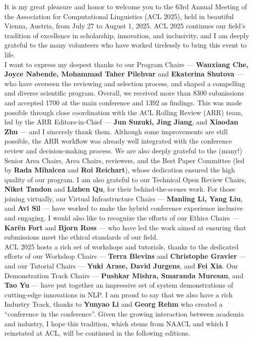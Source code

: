 It is my great pleasure and honor to welcome you to the 63rd Annual Meeting of the Association for Computational Linguistics (ACL 2025), held in beautiful Vienna, Austria, from July 27 to August 1, 2025. ACL 2025 continues our field’s tradition of excellence in scholarship, innovation, and inclusivity, and I am deeply grateful to the many volunteers who have worked tirelessly to bring this event to life.\\


I want to express my deepest thanks to our Program Chairs	--- \textbf{Wanxiang Che, Joyce Nabende, Mohammad Taher Pilehvar} and \textbf{Ekaterina Shutova} --- who have overseen the reviewing and selection process, and shaped a compelling and diverse scientific program. Overall, we received more than 8300 submissions and accepted 1700 at the main conference and 1392 as findings. This was made possible through close coordination with the ACL Rolling Review (ARR) team, led by the ARR Editors-in-Chief --- \textbf{Jun Suzuki, Jing Jiang}, and \textbf{Xiaodan Zhu} --- and I sincerely thank them. Although some improvements are still possible, the ARR workflow was already well integrated with the conference review and decision-making process. We are also deeply grateful to the (many!) Senior Area Chairs, Area Chairs, reviewers, and the Best Paper Committee (led by \textbf{Rada Mihalcea} and \textbf{Roi Reichart}), whose dedication ensured the high quality of our program. I am also grateful to our Technical Open Review Chairs, \textbf{Niket Tandon} and \textbf{Lizhen Qu}, for their behind-the-scenes work. For those joining virtually, our Virtual Infrastructure Chairs --- \textbf{Manling Li, Yang Liu}, and \textbf{Avi Sil} --- have worked to make the hybrid conference experience inclusive and engaging. I would also like to recognize the efforts of our Ethics Chairs --- \textbf{Karën Fort} and \textbf{Bjorn Ross} --- who have led the work aimed at ensuring that submissions meet the ethical standards of our field. \\


ACL 2025 hosts a rich set of workshops and tutorials, thanks to the dedicated efforts of our Workshop Chairs 	--- \textbf{Terra Blevins} and \textbf{Christophe Gravier} --- and our Tutorial Chairs --- \textbf{Yuki Arase, David Jurgens}, and \textbf{Fei Xia}. Our Demonstration Track Chairs --- \textbf{Pushkar Mishra, Smaranda Muresan}, and \textbf{Tao Yu} --- have put together an impressive set of system demonstrations of cutting-edge innovations in NLP. I am proud to say that we also have a rich Industry Track, thanks to \textbf{Yunyao Li} and \textbf{Georg Rehm} who created a “conference in the conference”. Given the growing interaction between academia and industry, I hope this tradition, which stems from NAACL and which I reinstated at ACL, will be continued in the following editions.\\


